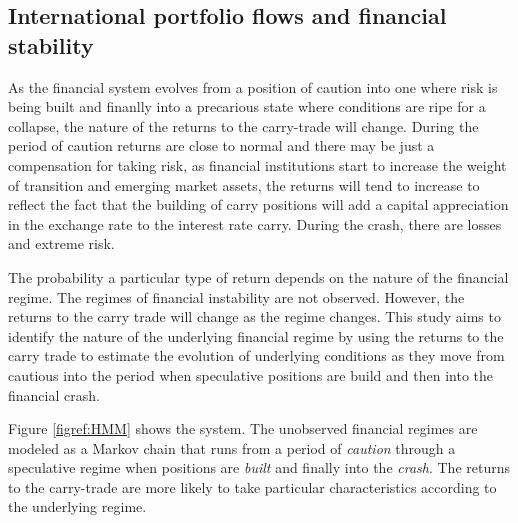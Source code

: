 \documentclass[12pt, a4paper, oneside]{article} %
\begin{document}
\subsection{International portfolio flows and financial stability}
As the financial system evolves from a position of caution into one where risk is being built and finanlly into a precarious state where conditions are ripe for a collapse, the nature of the returns to the carry-trade will change. During the period of caution returns are close to normal and there may be just a compensation for taking risk, as financial institutions start to increase the weight of transition and emerging market assets, the returns will tend to increase to reflect the fact that the building of carry positions will add a capital appreciation in the exchange rate to the interest rate carry. During the crash, there are losses and extreme risk.   

The probability a particular type of return depends on the nature of the financial regime.   The regimes of financial instability are not observed.  However, the returns to the carry trade will change as the regime changes. This study aims to identify the nature of the underlying financial regime by using the returns to the carry trade to estimate the evolution of underlying conditions as they move from cautious into the period when speculative positions are build and then into the financial crash. 

Figure \ref{figref:HMM} shows the system.  The unobserved financial regimes are modeled as a Markov chain that runs from a period of \emph{caution} through a speculative regime when positions are \emph{built} and finally into the \emph{crash}.  The returns to the carry-trade are more likely to take particular characteristics according to the underlying regime.   
\end{document}
